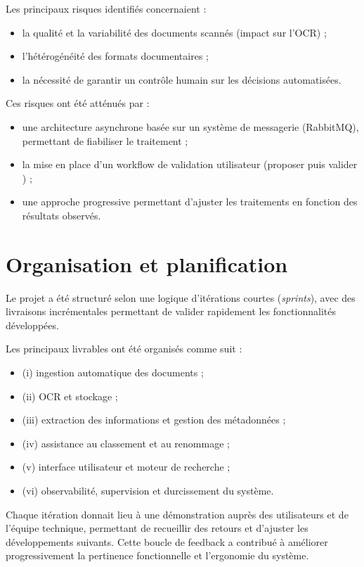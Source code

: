 \documentclass[12pt,a4paper]{report}
\begin{document}
Les principaux risques identifiés concernaient :
\begin{itemize}
  \item la qualité et la variabilité des documents scannés (impact sur l’OCR) ;
  \item l’hétérogénéité des formats documentaires ;
  \item la nécessité de garantir un contrôle humain sur les décisions automatisées.
\end{itemize}

Ces risques ont été atténués par :
\begin{itemize}
  \item une architecture asynchrone basée sur un système de messagerie (RabbitMQ), permettant de fiabiliser le traitement ;
  \item la mise en place d’un workflow de validation utilisateur (\og proposer puis valider \fg{}) ;
  \item une approche progressive permettant d’ajuster les traitements en fonction des résultats observés.
\end{itemize}

\section{Organisation et planification}
Le projet a été structuré selon une logique d’itérations courtes (\textit{sprints}), avec des livraisons incrémentales permettant de valider rapidement les fonctionnalités développées.

Les principaux livrables ont été organisés comme suit :
\begin{itemize}
  \item (i) ingestion automatique des documents ;
  \item (ii) OCR et stockage ;
  \item (iii) extraction des informations et gestion des métadonnées ;
  \item (iv) assistance au classement et au renommage ;
  \item (v) interface utilisateur et moteur de recherche ;
  \item (vi) observabilité, supervision et durcissement du système.
\end{itemize}

Chaque itération donnait lieu à une démonstration auprès des utilisateurs et de l’équipe technique, permettant de recueillir des retours et d’ajuster les développements suivants. Cette boucle de feedback a contribué à améliorer progressivement la pertinence fonctionnelle et l’ergonomie du système.
\end{document}
